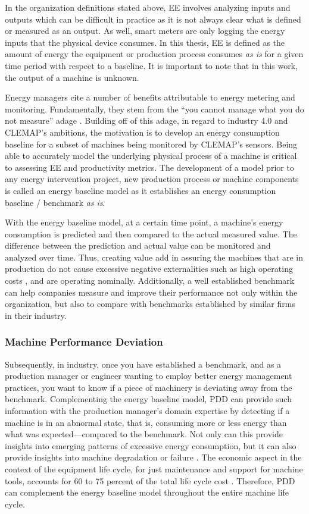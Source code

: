 In the organization definitions stated above, EE involves analyzing inputs and outputs which can be difficult in practice as it is not always clear what is defined or measured as an output. As well, smart meters are only logging the energy inputs that the physical device consumes. In this thesis, EE is defined as the amount of energy the equipment or production process consumes \textit{as is} for a given time period with respect to a baseline. It is important to note that in this work, the output of a machine is unknown.  

Energy managers cite a number of benefits attributable to energy metering and monitoring. Fundamentally, they stem from the “you cannot manage what you do not measure” adage \cite{3M}. Building off of this adage, in regard to industry 4.0 and CLEMAP's ambitions, the motivation is to develop an energy consumption baseline for a subset of machines being monitored by CLEMAP's sensors. Being able to accurately model the underlying physical process of a machine is critical to assessing EE and productivity metrics. The development of a model prior to any energy intervention project, new production process or machine components is called an energy baseline model as it establishes an energy consumption baseline / benchmark \textit{as is}. 

With the energy baseline model, at a certain time point, a machine's energy consumption is predicted and then compared to the actual measured value. The difference between the prediction and actual value can be monitored and analyzed over time. Thus, creating value add in assuring the machines that are in production do not cause excessive negative externalities such as high operating costs \cite{eea}, and are operating nominally. Additionally, a well established benchmark can help companies measure and improve their performance not only within the organization, but also to compare with benchmarks established by similar firms in their industry.

\subsubsection{Machine Performance Deviation}

Subsequently, in industry, once you have established a benchmark, and as a production manager or engineer wanting to employ better energy management practices, you want to know if a piece of machinery is deviating away from the benchmark. Complementing the energy baseline model, \ac{PDD} can provide such information with the production manager's domain expertise by detecting if a machine is in an abnormal state, that is, consuming more or less energy than what was expected—compared to the benchmark. Not only can this provide insights into emerging patterns of excessive energy consumption, but it can also provide insights into machine degradation or failure \cite{online-fault-monitoring}. The economic aspect in the context of the equipment life cycle, for just maintenance and support for machine tools, accounts for 60 to 75 percent of the total life cycle cost \cite{econ-costs}. Therefore, PDD can complement the energy baseline model throughout the entire machine life cycle.

